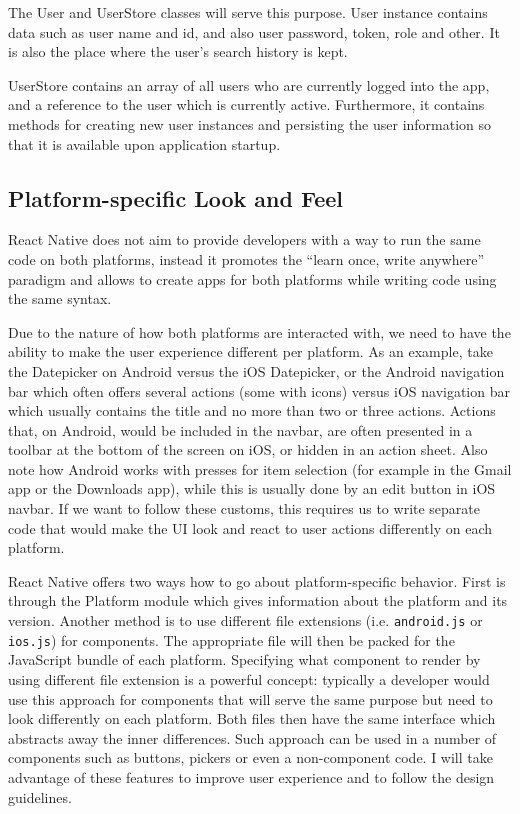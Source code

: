 The User and UserStore classes will serve this purpose. User instance contains data such as user name and id, and also user password, token, role and other. It is also the place where the user's search history is kept.

UserStore contains an array of all users who are currently logged into the app, and a reference to the user which is currently active. Furthermore, it contains methods for creating new user instances and persisting the user information so that it is available upon application startup.


\subsection{Platform-specific Look and Feel}

React Native does not aim to provide developers with a way to run the same code on both platforms, instead it promotes the “learn once, write anywhere” paradigm and allows to create apps for both platforms while writing code using the same syntax.


Due to the nature of how both platforms are interacted with, we need to have the ability to make the user experience different per platform. As an example, take the Datepicker on Android versus the iOS Datepicker, or the Android navigation bar which often offers several actions (some with icons) versus iOS navigation bar which usually contains the title and no more than two or three actions. 
Actions that, on Android, would be included in the navbar, are often presented in a toolbar at the bottom of the screen on iOS, or hidden in an action sheet. Also note how Android works with presses for item selection (for example in the Gmail app or the Downloads app), while this is usually done by an edit button in iOS navbar. If we want to follow these customs, this requires us to write separate code that would make the UI look and react to user actions differently on each platform.


React Native offers two ways how to go about platform-specific behavior. First is through the Platform module which gives information about the platform and its version. Another method is to use different file extensions (i.e. \texttt{android.js} or \texttt{ios.js}) for components. The appropriate file will then be packed for the JavaScript bundle of each platform. Specifying what component to render by using different file extension is a powerful concept: typically a developer would use this approach for components that will serve the same purpose but need to look differently on each platform. Both files then have the same interface which abstracts away the inner differences. Such approach can be used in a number of components such as buttons, pickers or even a non-component code. I will take advantage of these features to improve user experience and to follow the design guidelines.



